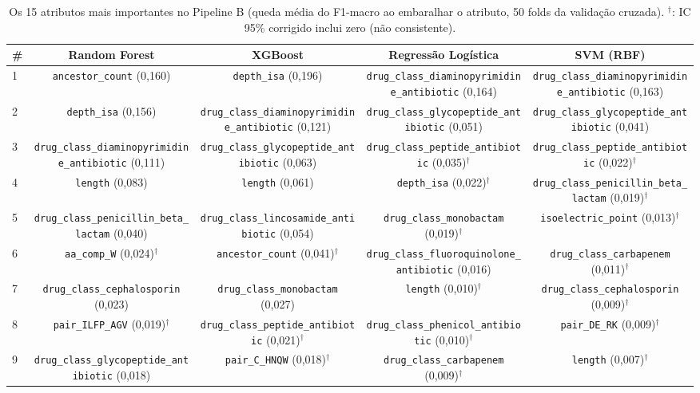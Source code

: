 \begin{table}[htbp]
  \centering
  \caption{Os 15 atributos mais importantes no Pipeline B (queda média do F1-macro ao embaralhar o atributo, 50 folds da validação cruzada). $^\dagger$: IC 95\% corrigido inclui zero (não consistente).}
  \label{tab:top_atributos_b}
  \begin{tabular}{lcccc}
    \toprule
    \# & Random Forest & XGBoost & Regressão Logística & SVM (RBF) \\
    \midrule
    1 & \texttt{ancestor\_count} (0,160) & \texttt{depth\_isa} (0,196) & \texttt{drug\_class\_diaminopyrimidine\_antibiotic} (0,164) & \texttt{drug\_class\_diaminopyrimidine\_antibiotic} (0,163) \\
    2 & \texttt{depth\_isa} (0,156) & \texttt{drug\_class\_diaminopyrimidine\_antibiotic} (0,121) & \texttt{drug\_class\_glycopeptide\_antibiotic} (0,051) & \texttt{drug\_class\_glycopeptide\_antibiotic} (0,041) \\
    3 & \texttt{drug\_class\_diaminopyrimidine\_antibiotic} (0,111) & \texttt{drug\_class\_glycopeptide\_antibiotic} (0,063) & \texttt{drug\_class\_peptide\_antibiotic} (0,035)$^\dagger$ & \texttt{drug\_class\_peptide\_antibiotic} (0,022)$^\dagger$ \\
    4 & \texttt{length} (0,083) & \texttt{length} (0,061) & \texttt{depth\_isa} (0,022)$^\dagger$ & \texttt{drug\_class\_penicillin\_beta\_lactam} (0,019)$^\dagger$ \\
    5 & \texttt{drug\_class\_penicillin\_beta\_lactam} (0,040) & \texttt{drug\_class\_lincosamide\_antibiotic} (0,054) & \texttt{drug\_class\_monobactam} (0,019)$^\dagger$ & \texttt{isoelectric\_point} (0,013)$^\dagger$ \\
    6 & \texttt{aa\_comp\_W} (0,024)$^\dagger$ & \texttt{ancestor\_count} (0,041)$^\dagger$ & \texttt{drug\_class\_fluoroquinolone\_antibiotic} (0,016) & \texttt{drug\_class\_carbapenem} (0,011)$^\dagger$ \\
    7 & \texttt{drug\_class\_cephalosporin} (0,023) & \texttt{drug\_class\_monobactam} (0,027) & \texttt{length} (0,010)$^\dagger$ & \texttt{drug\_class\_cephalosporin} (0,009)$^\dagger$ \\
    8 & \texttt{pair\_ILFP\_AGV} (0,019)$^\dagger$ & \texttt{drug\_class\_peptide\_antibiotic} (0,021)$^\dagger$ & \texttt{drug\_class\_phenicol\_antibiotic} (0,010)$^\dagger$ & \texttt{pair\_DE\_RK} (0,009)$^\dagger$ \\
    9 & \texttt{drug\_class\_glycopeptide\_antibiotic} (0,018) & \texttt{pair\_C\_HNQW} (0,018)$^\dagger$ & \texttt{drug\_class\_carbapenem} (0,009)$^\dagger$ & \texttt{length} (0,007)$^\dagger$ \\

\end{tabular}
\end{table}
